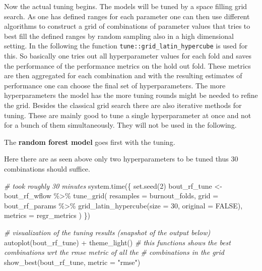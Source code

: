 \documentclass[
]{book}
\newenvironment{Shaded}{\begin{snugshade}}{\end{snugshade}}
\newcommand{\AttributeTok}[1]{\textcolor[rgb]{0.77,0.63,0.00}{#1}}
\newcommand{\CommentTok}[1]{\textcolor[rgb]{0.56,0.35,0.01}{\textit{#1}}}
\newcommand{\ConstantTok}[1]{\textcolor[rgb]{0.00,0.00,0.00}{#1}}
\newcommand{\DecValTok}[1]{\textcolor[rgb]{0.00,0.00,0.81}{#1}}
\newcommand{\FunctionTok}[1]{\textcolor[rgb]{0.00,0.00,0.00}{#1}}
\newcommand{\NormalTok}[1]{#1}
\newcommand{\OtherTok}[1]{\textcolor[rgb]{0.56,0.35,0.01}{#1}}
\newcommand{\SpecialCharTok}[1]{\textcolor[rgb]{0.00,0.00,0.00}{#1}}
\newcommand{\StringTok}[1]{\textcolor[rgb]{0.31,0.60,0.02}{#1}}
\begin{document}
Now the actual tuning begins. The models will be tuned by a space filling grid search. As one has defined ranges for each parameter one can then use different algorithms to construct a grid of combinations of parameter values that tries to best fill the defined ranges by random sampling also in a high dimensional setting. In the following the function \texttt{tune::grid\_latin\_hypercube} is used for this. So basically one tries out all hyperparameter values for each fold and saves the performance of the performance metrics on the hold out fold. These metrics are then aggregated for each combination and with the resulting estimates of performance one can choose the final set of hyperparameters. The more hyperparameters the model has the more tuning rounds might be needed to refine the grid. Besides the classical grid search there are also iterative methods for tuning. These are mainly good to tune a single hyperparameter at once and not for a bunch of them simultaneously. They will not be used in the following.

The \textbf{random forest model} goes first with the tuning.

Here there are as seen above only two hyperparameters to be tuned thus 30 combinations should suffice.

\begin{Shaded}
\begin{Highlighting}[]
\CommentTok{\# took roughly 30 minutes}
\FunctionTok{system.time}\NormalTok{(\{}
  \FunctionTok{set.seed}\NormalTok{(}\DecValTok{2}\NormalTok{)}
\NormalTok{  bout\_rf\_tune }\OtherTok{\textless{}{-}}\NormalTok{ bout\_rf\_wflow }\SpecialCharTok{\%\textgreater{}\%}
    \FunctionTok{tune\_grid}\NormalTok{(}
      \AttributeTok{resamples =}\NormalTok{  burnout\_folds,}
      \AttributeTok{grid =}\NormalTok{ bout\_rf\_params }\SpecialCharTok{\%\textgreater{}\%}
        \FunctionTok{grid\_latin\_hypercube}\NormalTok{(}\AttributeTok{size =} \DecValTok{30}\NormalTok{, }\AttributeTok{original =} \ConstantTok{FALSE}\NormalTok{),}
      \AttributeTok{metrics =}\NormalTok{ regr\_metrics}
\NormalTok{    )}
\NormalTok{\})}

\CommentTok{\# visualization of the tuning results (snapshot of the output below)}
\FunctionTok{autoplot}\NormalTok{(bout\_rf\_tune) }\SpecialCharTok{+} \FunctionTok{theme\_light}\NormalTok{()}
\CommentTok{\# this functions shows the best combinations wrt the rmse metric of all the}
\CommentTok{\# combinations in the grid}
\FunctionTok{show\_best}\NormalTok{(bout\_rf\_tune, }\AttributeTok{metric =} \StringTok{"rmse"}\NormalTok{)}
\end{Highlighting}
\end{Shaded}
\end{document}
